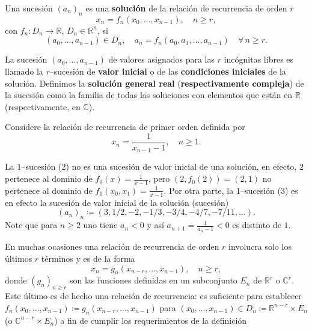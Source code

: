 \begin{definition}
	Una sucesión ${\left(a_{n}\right)}_{n}$ es una \textbf{solución} de la relación de recurrencia de orden $r$
		\begin{equation}
			x_{n}=f_{n}\left(x_{0},\ldots,x_{n-1}\right),\quad n\geq r,
		\end{equation}
	con $f_{n}\colon D_{n}\rightarrow\mathds{R}$, $D_{n}\in\mathds{R}^{n}$, si
		\begin{equation*}
			\left(a_{0},\ldots,a_{n-1}\right)\in D_{n},\quad a_{n}=f_{n}\left(a_{0},a_{1},\ldots,a_{n-1}\right)\quad\forall\,n\geq r.
		\end{equation*}
\end{definition}

La sucesión $\left(a_{0},\ldots,a_{n-1}\right)$ de valores asignados para las $r$ incógnitas libres es llamado la $r$--sucesión de \textbf{valor inicial} o de las \textbf{condiciones iniciales} de la solución. Definimos la \textbf{solución general real} (\textbf{respectivamente compleja}) de la sucesión como la familia de todas las soluciones con elementos que están en $\mathds{R}$ (respectivamente, en $\mathds{C}$).

\begin{example}{}
	Considere la relación de recurrencia de primer orden definida por \[x_{n}=\frac{1}{x_{n-1}-1},\quad n\geq1.\]
\end{example}

La $1$--sucesión (2) no es una sucesión de valor inicial de una solución, en efecto, $2$ pertenece al dominio de $f_{0}\left(x\right)=\frac{1}{x-1}$, pero $\left(2,f_{0}(2)\right)=\left(2,1\right)$ no pertenece al dominio de $f_{1}\left(x_{0},x_{1}\right)=\frac{1}{x-1}$. Por otra parte, la $1$--sucesión (3) es en efecto la sucesión de valor inicial de la solución (sucesión) \[\left(a_{n}\right)_{n}\coloneqq\left(3,1/2,-2,-1/3,-3/4,-4/7,-7/11,\ldots\right).\]
Note que para $n\geq2$ uno tiene $a_{n}<0$ y así $a_{n+1}=\frac{1}{a_{n}-1}<0$ es distinto de $1$.

\begin{example}{}
	En muchas ocasiones una relación de recurrencia de orden $r$ involucra solo los últimos $r$ términos y es de la forma
	\begin{equation*}
		x_{n}=g_{n}\left(x_{n-r},\ldots,x_{n-1}\right),\quad n\geq r,
	\end{equation*}
	donde ${\left(g_{n}\right)}_{n\geq r}$ son las funciones definidas en un subconjunto $E_{n}$ de $\mathds{R}^{r}$ o $\mathds{C}^{r}$. Este último es de hecho una relación de recurrencia: es suficiente para establecer $f_{n}\left(x_{0},\ldots,x_{n-1}\right)\coloneqq g_{n}\left(x_{n-r},\ldots,x_{n-1}\right)$ para $\left(x_{0},\ldots,x_{n-1}\right)\in D_{n}\coloneqq\mathds{R}^{n-r}\times E_{n}$ (o $\mathds{C}^{n-r}\times E_{n}$) a fin de cumplir los requerimientos de la definición %
\end{example}

